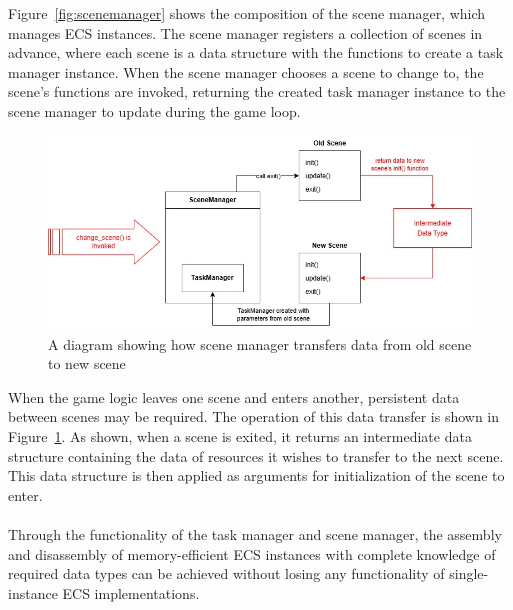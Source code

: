 \vspace{0.5cm}

\noindent Figure~\ref{fig:scenemanager} shows the composition of the scene manager, which manages ECS instances.
The scene manager registers a collection of scenes in advance, where each scene is a data structure with the
functions to create a task manager instance.
When the scene manager chooses a scene to change to, the scene's functions are invoked, returning the created
task manager instance to the scene manager to update during the game loop.

\vspace{0.5cm}

\begin{figure}[h]
    \centering
    \includegraphics[width=\columnwidth, keepaspectratio]{images/scenemanager2}
    \caption{A diagram showing how scene manager transfers data from old scene to new scene}
    \label{fig:scenemanager2}
\end{figure}

\vspace{0.5cm}

\noindent When the game logic leaves one scene and enters another, persistent data between scenes may be required.
The operation of this data transfer is shown in Figure~\ref{fig:scenemanager2}.
As shown, when a scene is exited, it returns an intermediate data structure containing the data of resources
it wishes to transfer to the next scene.
This data structure is then applied as arguments for initialization of the scene to enter.
\\\\
Through the functionality of the task manager and scene manager, the assembly and disassembly of memory-efficient
ECS instances with complete knowledge of required data types can be achieved without losing any functionality of
single-instance ECS implementations.

\vspace{0.5cm}

